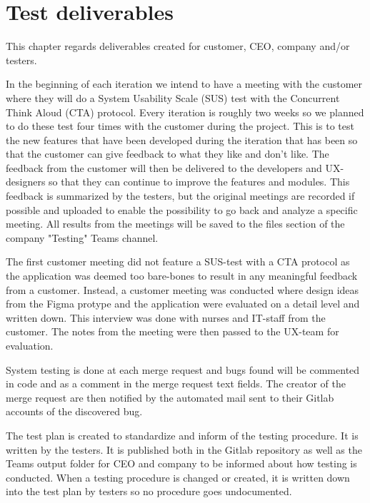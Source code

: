\section{Test deliverables}
This chapter regards deliverables created for customer, CEO, company and/or testers.

\noindent In the beginning of each iteration we intend to have a meeting with the customer where they will do a System Usability Scale (SUS) test with the Concurrent Think Aloud (CTA) protocol. Every iteration is roughly two weeks so we planned to do these test four times with the customer during the project. This is to test the new features that have been developed during the iteration that has been so that the customer can give feedback to what they like and don't like. The feedback from the customer will then be delivered to the developers and UX-designers so that they can continue to improve the features and modules. This feedback is summarized by the testers, but the original meetings are recorded if possible and uploaded to enable the possibility to go back and analyze a specific meeting. All results from the meetings will be saved to the files section of the company "Testing" Teams channel. \newline

\noindent The first customer meeting did not feature a SUS-test with a CTA protocol as the application was deemed too bare-bones to result in any meaningful feedback from a customer. Instead, a customer meeting was conducted where design ideas from the Figma protype and the application were evaluated on a detail level and written down. This interview was done with nurses and IT-staff from the customer. The notes from the meeting were then passed to the UX-team for evaluation.\newline

\noindent System testing is done at each merge request and bugs found will be commented in code and as a comment in the merge request text fields. The creator of the merge request are then notified by the automated mail sent to their Gitlab accounts of the discovered bug.\newline

\noindent The test plan is created to standardize and inform of the testing procedure. It is written by the testers. It is published both in the Gitlab repository as well as the Teams output folder for CEO and company to be informed about how testing is conducted. When a testing procedure is changed or created, it is written down into the test plan by testers so no procedure goes undocumented.

